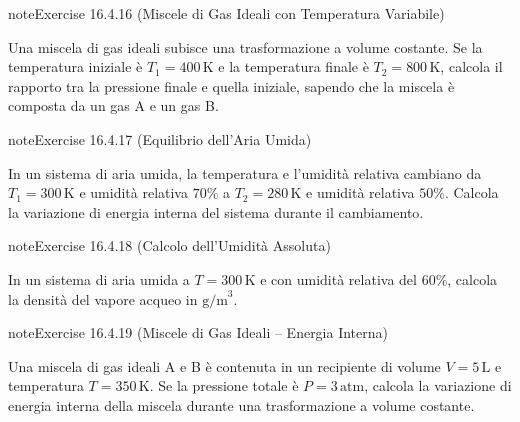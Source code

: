 \documentclass[letterpaper,10pt,italian]{jupyterBook}
\begin{document}
\begin{sphinxadmonition}{note}{Exercise 16.4.16 (Miscele di Gas Ideali con Temperatura Variabile)}



\sphinxAtStartPar
Una miscela di gas ideali subisce una trasformazione a volume costante. Se la temperatura iniziale è \(T_1 = 400 \, \text{K}\) e la temperatura finale è \(T_2 = 800 \, \text{K}\), calcola il rapporto tra la pressione finale e quella iniziale, sapendo che la miscela è composta da un gas A e un gas B.
\end{sphinxadmonition}
 \label{exercise:ch/thermodynamics/matter-problems-exercise-16}

\begin{sphinxadmonition}{note}{Exercise 16.4.17 (Equilibrio dell’Aria Umida)}



\sphinxAtStartPar
In un sistema di aria umida, la temperatura e l’umidità relativa cambiano da \(T_1 = 300 \, \text{K}\) e umidità relativa \(70\%\) a \(T_2 = 280 \, \text{K}\) e umidità relativa \(50\%\). Calcola la variazione di energia interna del sistema durante il cambiamento.
\end{sphinxadmonition}
 \label{exercise:ch/thermodynamics/matter-problems-exercise-17}

\begin{sphinxadmonition}{note}{Exercise 16.4.18 (Calcolo dell’Umidità Assoluta)}



\sphinxAtStartPar
In un sistema di aria umida a \(T = 300 \, \text{K}\) e con umidità relativa del \(60\%\), calcola la densità del vapore acqueo in \( \text{g/m}^3\).
\end{sphinxadmonition}
 \label{exercise:ch/thermodynamics/matter-problems-exercise-18}

\begin{sphinxadmonition}{note}{Exercise 16.4.19 (Miscele di Gas Ideali – Energia Interna)}



\sphinxAtStartPar
Una miscela di gas ideali A e B è contenuta in un recipiente di volume \(V = 5 \, \text{L}\) e temperatura \(T = 350 \, \text{K}\). Se la pressione totale è \(P = 3 \, \text{atm}\), calcola la variazione di energia interna della miscela durante una trasformazione a volume costante.
\end{sphinxadmonition}
 \label{exercise:ch/thermodynamics/matter-problems-exercise-19}
\end{document}
